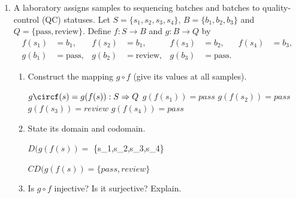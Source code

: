 \documentclass[12pt]{article}
\begin{document}
\begin{enumerate}
\begin{enumerate}
        $(g \circ f)(x) = g(f(x)) = (2x-1)^2
        
        \item Find \((f \circ g)(x)\).

        $(f \circ g)(x) = f(g(x)) = 2x^2-1
        
        \item Evaluate both compositions at \(x = 2\).

        $(g \circ f)(2) = 3^2 = 9

        $(f \circ g)(2) = 8 - 1 = 7$
        
        \item Does \(f \circ g = g \circ f\) hold? Explain.

        Assume \(f \circ g = g \circ f\).
        Then $2x^2 =1 = (2x-1)^2

        $x^2 - 2x + 1 = 0$

        $(x-1)^2 = 0$

        Thus, \(f \circ g = g \circ f\) holds iff $x = 1$. Thus it doesn't hold in general case
    \end{enumerate}
    
    \item A laboratory assigns samples to sequencing batches and batches to quality-control (QC) statuses. Let \(S = \{s_1, s_2, s_3, s_4\}\), \(B = \{b_1, b_2, b_3\}\) and \(Q = \{\text{pass}, \text{review}\}\). Define \(f : S \to B\) and \(g : B \to Q\) by
    \begin{align*}
        f(s_1) &= b_1, & f(s_2) &= b_1, & f(s_3) &= b_2, & f(s_4) &= b_3, \\
        g(b_1) &= \text{pass}, & g(b_2) &= \text{review}, & g(b_3) &= \text{pass}.
    \end{align*}
    \begin{enumerate}
        \item Construct the mapping \(g \circ f\) (give its values at all samples).

        $g\circf(s) = g(f(s)) : S \Rightarrow Q$
        $g(f(s_1)) = pass$
        $g(f(s_2)) = pass$
        $g(f(s_3)) = review$
        $g(f(s_4)) = pass$
        
        \item State its domain and codomain.

        $D(g(f(s)) =$ \{s_1,s_2,s_3,s_4\}
        
        $CD(g(f(s)) = \{pass, review\}$
        
        \item Is \(g \circ f\) injective? Is it surjective? Explain.


\end{enumerate}
\end{enumerate}
\end{document}
